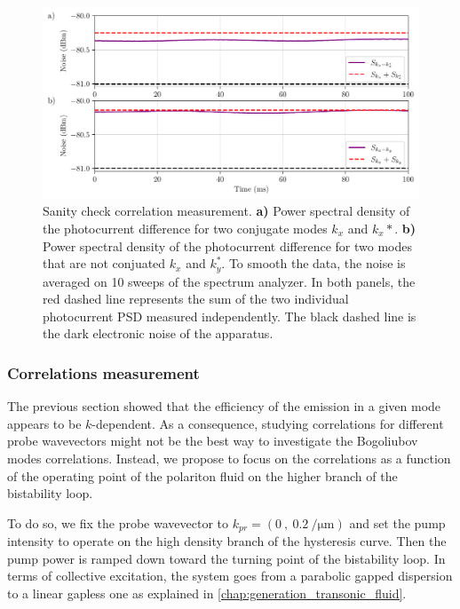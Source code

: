 \begin{figure}
    \centering
    \includegraphics[width=1\textwidth]{chap_correlation/fig/noise_comparison.pdf}
    \caption{Sanity check correlation measurement. \textbf{a)} Power spectral density of the photocurrent difference for two conjugate modes $k_x$ and $k_x*$. \textbf{b)} Power spectral density of the photocurrent difference for two modes that are not conjuated $k_x$ and $k_y^*$. To smooth 
    the data, the noise is averaged on 10 sweeps of the spectrum analyzer. In both panels, the red dashed line represents the sum of the two individual photocurrent PSD measured independently. The black dashed line is the dark electronic noise of the apparatus.} 
    \label{fig:noise_comparison}
\end{figure}



\subsubsection{Correlations measurement}
\label{sec:exp_corr_measurement}

The previous section showed that the efficiency of the emission in a given mode appears to be $k$-dependent. As a consequence, studying correlations for different probe wavevectors might not be the best way to investigate the Bogoliubov modes correlations.
Instead, we propose to focus on the correlations as a function of the operating point of the polariton fluid on the higher branch of the bistability loop. 

To do so, we fix the probe wavevector to $k_{pr}=(0\ ,\ \SI{0.2}{\per\micro\meter})$ and set the pump intensity to operate on the high density branch of the hysteresis curve. Then the pump power is ramped down toward the turning point of the bistability loop.
In terms of collective excitation, the system goes from a parabolic gapped dispersion to a linear gapless one as explained in \autoref{chap:generation_transonic_fluid}.


